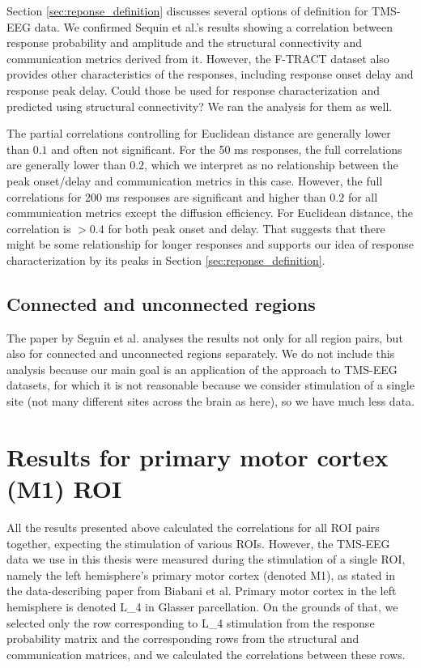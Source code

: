 Section \ref{sec:reponse_definition} discusses several options of  definition for TMS-EEG data. We confirmed Sequin et al.'s results showing a correlation between response probability and amplitude and the structural connectivity and communication metrics derived from it. However, the F-TRACT dataset also provides other characteristics of the responses, including response onset delay and response peak delay. Could those be used for response characterization and predicted using structural connectivity? We ran the analysis for them as well.

The partial correlations controlling for Euclidean distance are generally lower than $0.1$ and often not significant. For the 50 ms responses, the full correlations are generally lower than $0.2$, which we interpret as no relationship between the peak onset/delay and communication metrics in this case. However, the full correlations for 200 ms responses are significant and higher than $0.2$ for all communication metrics except the diffusion efficiency. For Euclidean distance, the correlation is $>0.4$ for both peak onset and delay. That suggests that there might be some relationship for longer responses and supports our idea of response characterization by its peaks in Section \ref{sec:reponse_definition}.

\subsection{Connected and unconnected regions}

The paper by Seguin et al. \cite{seguin_communication_2023} analyses the results not only for all region pairs, but also for connected and unconnected regions separately. We do not include this analysis because our main goal is an application of the approach to TMS-EEG datasets, for which it is not reasonable because we consider stimulation of a single site (not many different sites across the brain as here), so we have much less data.

\section{Results for primary motor cortex (M1) ROI}\label{sec:ftract_results_per_roi}

All the results presented above calculated the correlations for all ROI pairs together, expecting the stimulation of various ROIs. However, the TMS-EEG data we use in this thesis were measured during the stimulation of a single ROI, namely the left hemisphere's primary motor cortex (denoted M1), as stated in the data-describing paper from Biabani et al. \cite{biabani_characterizing_2019} Primary motor cortex in the left hemisphere is denoted L\_4 in Glasser parcellation. On the grounds of that, we selected only the row corresponding to L\_4 stimulation from the response probability matrix and the corresponding rows from the structural and communication matrices, and we calculated the correlations between these rows. 


